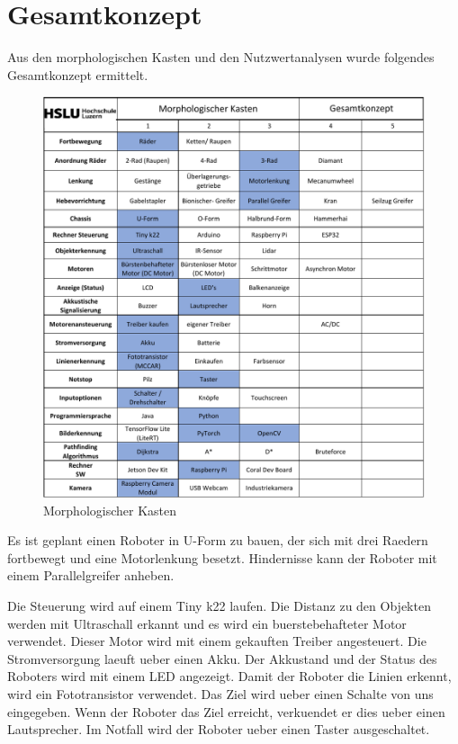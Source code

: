 \section{Gesamtkonzept}

Aus den morphologischen Kasten und den Nutzwertanalysen wurde folgendes Gesamtkonzept ermittelt. 

\begin{figure}[H]
\centering
\includegraphics[width=\textwidth]{assets/MK-Gesamt.pdf}
\caption{Morphologischer Kasten}
\label{fig:mk-all}
\end{figure}

Es ist geplant einen Roboter in U-Form zu bauen, der sich mit drei Raedern fortbewegt und eine Motorlenkung besetzt. Hindernisse kann der Roboter mit einem Parallelgreifer anheben.

Die Steuerung wird auf einem Tiny k22 laufen. Die Distanz zu den Objekten werden mit Ultraschall erkannt und es wird ein buerstebehafteter Motor verwendet. Dieser Motor wird mit einem gekauften Treiber angesteuert. Die Stromversorgung laeuft ueber einen Akku. Der Akkustand und der Status des Roboters wird mit einem LED angezeigt. Damit der Roboter die Linien erkennt, wird ein Fototransistor verwendet. Das Ziel wird ueber einen Schalte von uns eingegeben.
Wenn der Roboter das Ziel erreicht, verkuendet er dies ueber einen Lautsprecher. Im Notfall wird der Roboter ueber einen Taster ausgeschaltet.

